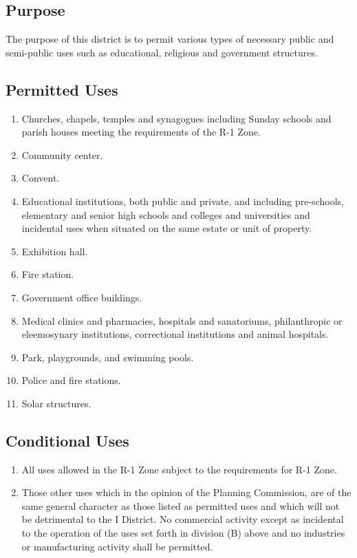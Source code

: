 \subsection{Purpose}
The purpose of this district is to permit various types of necessary public and semi-public uses such as educational, religious and government structures.
\subsection{Permitted Uses}
\begin{enumerate}[{\indent}1)]
    \item Churches, chapels, temples and synagogues including Sunday schools and parish houses meeting the requirements of the R-1 Zone.
    \item Community center.
    \item Convent.
    \item Educational institutions, both public and private, and including pre-schools, elementary and senior high schools and colleges and universities and incidental uses when situated on the same estate or unit of property.
    \item Exhibition hall.
    \item Fire station.
    \item Government office buildings.
    \item Medical clinics and pharmacies, hospitals and sanatoriums, philanthropic or eleemosynary institutions, correctional institutions and animal hospitals.
    \item Park, playgrounds, and swimming pools.
    \item Police and fire stations.
    \item Solar structures.
\end{enumerate}
\subsection{Conditional Uses}
\begin{enumerate}[{\indent}1)]
    \item All uses allowed in the R-1 Zone subject to the requirements for R-1 Zone.
    \item Those other uses which in the opinion of the Planning Commission, are of the same general character as those listed as permitted uses and which will not be detrimental to the I District.  No commercial activity except as incidental to the operation of the uses set forth in division (B) above and no industries or manufacturing activity shall be permitted.
\end{enumerate}
